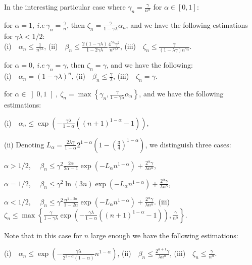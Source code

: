 \begin{lemma}
\label{le:nalpha}
In the interesting particular case where $\gamma_n = \displaystyle \frac{\gamma}{n^\alpha}$ for $\alpha \in [0,1]$:
\BIT
\item for $\alpha = 1,\ i.e \ \gamma_n=\displaystyle \frac{\gamma}{n}$, then $\zeta_n = \displaystyle \frac{\gamma}{1-\gamma\lambda}\alpha_n$, and we have the following estimations for $\gamma\lambda < 1/2$: \\(i)\ ~$\alpha_n \leqslant \displaystyle \frac{1}{n^{\gamma\lambda}}$, (ii)\ ~$\beta_n \leqslant \displaystyle \frac{2(1-\gamma\lambda)}{1-2\gamma\lambda} \frac{4^{\gamma\lambda}\gamma^2}{n^{2\gamma\lambda}}$, (iii)\ ~$ \zeta_n \leqslant \displaystyle \frac{\gamma}{(1-\lambda\gamma)n^{\gamma\lambda}}$.
\item for $\alpha = 0,\ i.e \ \gamma_n=\displaystyle \gamma$, then $\zeta_n = \gamma$, and we have the following: \\(i)\ ~$\alpha_n = (1-\gamma\lambda)^n$, (ii)\ ~$\beta_n \leqslant \displaystyle \frac{\gamma}{\lambda}$, (iii)\ ~$ \zeta_n = \gamma$.
\item for $\alpha \in \left]0,1\right[,\ \zeta_n=\max\left\{ \gamma_n, \displaystyle \frac{\gamma}{1-\gamma\lambda}\alpha_n \right\}$, and we have the following estimations: 

(i)\ ~$\alpha_n \leqslant \displaystyle \exp\left(  -\frac{\gamma\lambda}{1-\alpha}\left( (n+1)^{1-\alpha} -1  \right)   \right)$, 

(ii) Denoting $ L_\alpha = \frac{2\lambda\gamma}{1-\alpha} 2^{1-\alpha}\left( 1-\left(\frac{3}{4}\right)^{1-\alpha} \right)$, we distinguish three cases:  
\BIT
\item $\alpha >1/2$, \ ~$\beta_n \leqslant \gamma^2\frac{2\alpha}{2\alpha-1} \exp\left( -L_\alpha n^{1-\alpha}\right) +  \frac{2^\alpha\gamma}{\lambda n^\alpha}$,
\item $\alpha = 1/2$, \ ~$\beta_n \leqslant \gamma^2\ln (3n) \exp\left( -L_\alpha n^{1-\alpha}\right) +  \frac{2^\alpha\gamma}{\lambda n^\alpha}$,
\item $\alpha  < 1/2$, \ ~$\beta_n \leqslant \gamma^2\frac{n^{1-2\alpha}}{1- 2\alpha} \exp\left( -L_\alpha n^{1-\alpha}\right) +  \frac{2^\alpha\gamma}{\lambda n^\alpha}$.
\EIT
(iii)\ ~$ \zeta_n \leqslant \max \left\{\frac{\gamma}{1-\gamma\lambda}\exp\left(  -\frac{\gamma\lambda}{1-\alpha}\left( (n+1)^{1-\alpha} -1  \right)   \right), \frac{\gamma}{n^\alpha} \right\}.$
\EIT

Note that in this case for $n$ large enough we have the following estimations: 

(i)\ ~$\alpha_n \leqslant \displaystyle \exp\left(  -\frac{\gamma\lambda}{2^{1-\alpha}(1-\alpha)}n^{1-\alpha}    \right)$, (ii)\ ~$\beta_n \leqslant \displaystyle \frac{2^{\alpha+1}\gamma}{\lambda n^\alpha}$, (iii)\ ~$ \zeta_n \leqslant \displaystyle \frac{\gamma}{n^{\alpha}}$.
\end{lemma}

